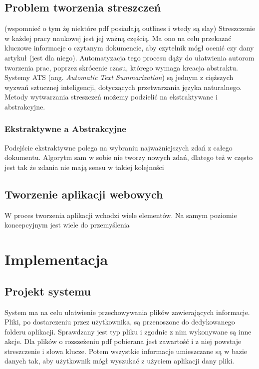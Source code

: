 \documentclass[12pt,a4paper,twoside]{article}
\begin{document}
\subsection{Problem tworzenia streszczeń}
(wspomnieć o tym żę niektóre pdf posiadają outlines i wtedy są slay)
Streszczenie w każdej pracy naukowej jest jej ważną częścią. Ma ono na celu przekazać kluczowe informacje o czytanym dokumencie, aby czytelnik mógł ocenić czy dany artykuł (jest dla niego). Automatyzacja tego procesu dąży do ułatwienia autorom tworzenia prac, poprzez skrócenie czasu, którego wymaga kreacja abstraktu. Systemy ATS (ang. \textit{Automatic Text Summarization}) są jednym z cięższych wyzwań sztucznej inteligencji, dotyczących przetwarzania języka naturalnego. Metody wytwarzania streszczeń możemy podzielić na ekstraktywane i abstrakcyjne.
\subsubsection*{Ekstraktywne a Abstrakcyjne}
Podejście ekstraktywne polega na wybraniu najważniejszych zdań z całego dokumentu. Algorytm sam w sobie nie tworzy nowych zdań, dlatego też w często jest tak że zdania nie mają sensu w takiej kolejności
\newpage
\subsection{Tworzenie aplikacji webowych}
W proces tworzenia aplikacji wchodzi wiele elementów. Na samym poziomie koncepcyjnym jest wiele do przemyślenia
\section{Implementacja}
\subsection{Projekt systemu}
System ma na celu ułatwienie przechowywania plików zawierających informacje. Pliki, po dostarczeniu przez użytkownika, są przenoszone do dedykowanego folderu aplikacji. Sprawdzany jest typ pliku i zgodnie z nim wykonywane są inne akcje. Dla plików o rozszeżeniu pdf pobierana jest zawartość i z niej powstaje streszczenie i słowa klucze. Potem wszystkie informacje umieszczane są w bazie danych tak, aby użytkownik mógł wyszukać z użyciem aplikacji dany pliki. \par
\end{document}
